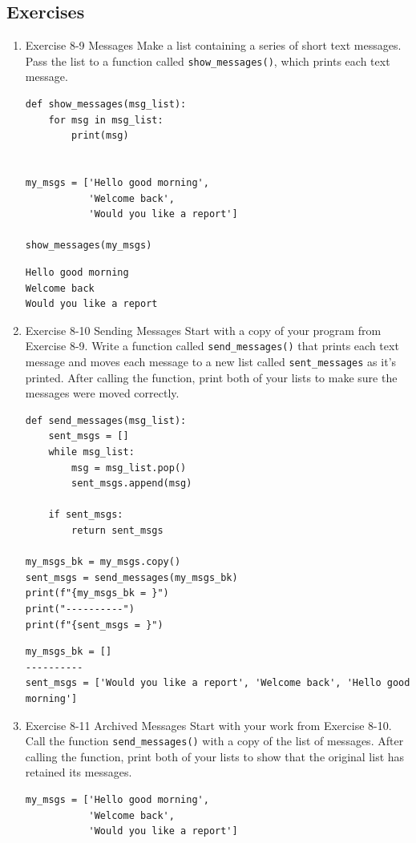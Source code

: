 \documentclass[10pt]{book}
\begin{document}
\subsection{Exercises}
\label{sec:orgc8e0982}
\begin{enumerate}
\item Exercise 8-9 Messages
\label{sec:org50787b9}
Make a list containing a series of short text messages. Pass the list to a function called \texttt{show\_messages()}, which prints each text message.
\begin{verbatim}
def show_messages(msg_list):
    for msg in msg_list:
        print(msg)


my_msgs = ['Hello good morning',
           'Welcome back',
           'Would you like a report']

show_messages(my_msgs)
\end{verbatim}

\label{orgca7d1d9}
\begin{verbatim}
Hello good morning
Welcome back
Would you like a report
\end{verbatim}
\item Exercise 8-10 Sending Messages
\label{sec:org85892d2}
Start with a copy of your program from Exercise 8-9. Write a function called \texttt{send\_messages()} that prints each text message and moves each message to a new list called \texttt{sent\_messages} as it’s printed. After calling the function, print both of your lists to make sure the messages were moved correctly.
\begin{verbatim}
def send_messages(msg_list):
    sent_msgs = []
    while msg_list:
        msg = msg_list.pop()
        sent_msgs.append(msg)

    if sent_msgs:
        return sent_msgs

my_msgs_bk = my_msgs.copy()
sent_msgs = send_messages(my_msgs_bk)
print(f"{my_msgs_bk = }")
print("----------")
print(f"{sent_msgs = }")
\end{verbatim}

\label{orgdc80c35}
\begin{verbatim}
my_msgs_bk = []
----------
sent_msgs = ['Would you like a report', 'Welcome back', 'Hello good morning']
\end{verbatim}
\item Exercise 8-11 Archived Messages
\label{sec:org3af53eb}
Start with your work from Exercise 8-10. Call the function \texttt{send\_messages()} with a copy of the list of messages. After calling the function, print both of your lists to show that the original list has retained its messages.
\begin{verbatim}
my_msgs = ['Hello good morning',
           'Welcome back',
           'Would you like a report']


\end{verbatim}
\end{enumerate}
\end{document}

